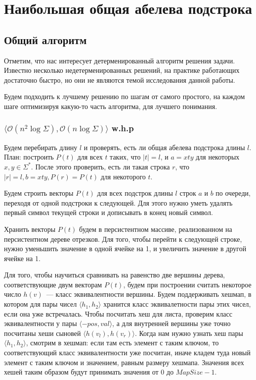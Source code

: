 \section{Наибольшая общая абелева подстрока}

\subsection{Общий алгоритм}

Отметим, что нас интересует детерменированный алгоритм решения задачи. Известно несколько недетерменированных решений, на практике работающих достаточно быстро, но они не являются темой исследования данной работы.

Будем подходить к лучшему решению по шагам от самого простого, на каждом шаге оптимизируя какую-то часть алгоритма, для лучшего понимания.

\subsubsection{$\langle \mathcal{O}(n^2 \log \Sigma), \mathcal{O}(n \log \Sigma) \rangle$ w.h.p}

Будем перебирать длину $l$ и проверять, есть ли общая абелева подстрока длины $l$.
План: построить $P(t)$ для всех $t$ таких, что $|t|=l$, и $a=xty$ для некоторых $x, y \in \Sigma^*$. После этого проверить, есть ли такая строка $r$, что $|r|=l, b=xty, P(r)=P(t)$ для некоторого $t$.

Будем строить векторы $P(t)$ для всех подстрок длины $l$ строк $a$ и $b$ по очереди, переходя от одной подстроки к следующей. Для этого нужно уметь удалять первый символ текущей строки и дописывать в конец новый символ.

Хранить векторы $P(t)$ будем в персистентном массиве, реализованном на персистентном дереве отрезков. Для того, чтобы перейти к следующей строке, нужно уменьшить значение в одной ячейке на 1, и увеличить значение в другой ячейке на 1.

Для того, чтобы научиться сравнивать на равенство две вершины дерева, соответствующие двум векторам $P(t)$, будем при построении считать некоторое число $h(v)$~--- класс эквивалентности вершины. Будем поддерживать хешмап, в котором для пары чисел $\langle h_1, h_2 \rangle$ хранится класс эквивалетности пары этих чисел, если она уже встречалась. Чтобы посчитать хеш для листа, проверим класс эквивалентности у пары $\langle -pos, val \rangle$, а для внутренней вершины уже точно посчитаны хеши сыновей $\langle h(v_l), h(v_r) \rangle$. Когда нам нужно узнать хеш пары $\langle h_1, h_2 \rangle$, смотрим в хешмап: если там есть элемент с таким ключом, то соответствующий класс эквивалентности уже посчитан, иначе кладем туда новый элемент с таким ключом и значением, равным размеру хешмапа. Значения всех хешей таким образом будут принимать значения от $0$ до $MapSize - 1$.

